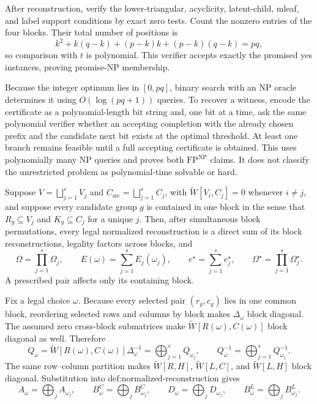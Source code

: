 After reconstruction, verify the lower-triangular, acyclicity, latent-child, mleaf, and label support conditions by exact zero tests.  Count the nonzero entries of the four blocks.  Their total number of positions is
\[
k^2+k(q-k)+(p-k)k+(p-k)(q-k)=pq,
\]
so comparison with \(t\) is polynomial.  This verifier accepts exactly the promised yes instances, proving promise-\(\mathrm{NP}\) membership.

Because the integer optimum lies in \([0,pq]\), binary search with an \(\mathrm{NP}\) oracle determines it using \(O(\log(pq+1))\) queries.  To recover a witness, encode the certificate as a polynomial-length bit string and, one bit at a time, ask the same polynomial verifier whether an accepting completion with the already chosen prefix and the candidate next bit exists at the optimal threshold.  At least one branch remains feasible until a full accepting certificate is obtained.  This uses polynomially many \(\mathrm{NP}\) queries and proves both \(\mathrm{FP}^{\mathrm{NP}}\) claims.  It does not classify the unrestricted problem as polynomial-time solvable or hard.

Suppose \(V=\bigsqcup_{j=1}^sV_j\) and \(C_{\mathrm{src}}=\bigsqcup_{j=1}^sC_j\), with \(\widetilde W[V_i,C_j]=0\) whenever \(i\ne j\), and suppose every candidate group \(g\) is contained in one block in the sense that \(R_g\subseteq V_j\) and \(K_g\subseteq C_j\) for a unique \(j\).  Then, after simultaneous block permutations, every legal normalized reconstruction is a direct sum of its block reconstructions, legality factors across blocks, and
\[
\Omega=\prod_{j=1}^s\Omega_j,
\qquad
E(\omega)=\sum_{j=1}^sE_j(\omega_j),
\qquad
e^\star=\sum_{j=1}^se_j^\star,
\qquad
\Omega^\star=\prod_{j=1}^s\Omega_j^\star.
\]
A prescribed pair affects only its containing block.

Fix a legal choice \(\omega\).  Because every selected pair \((r_g,c_g)\) lies in one common block, reordering selected rows and columns by block makes \(\Delta_\omega\) block diagonal.  The assumed zero cross-block submatrices make \(\widetilde W[R(\omega),C(\omega)]\) block diagonal as well.  Therefore
\[
Q_\omega
=\widetilde W[R(\omega),C(\omega)]\Delta_\omega^{-1}
=\bigoplus_{j=1}^sQ_{\omega_j},
\qquad
Q_\omega^{-1}=\bigoplus_{j=1}^sQ_{\omega_j}^{-1}.
\]
The same row--column partition makes \(\widetilde W[R,H]\), \(\widetilde W[L,C]\), and \(\widetilde W[L,H]\) block diagonal.  Substitution into \(\text{def:normalized-reconstruction}\) gives
\[
A_\omega=\bigoplus_jA_{\omega_j},
\qquad
B^C_\omega=\bigoplus_jB^C_{\omega_j},
\qquad
D_\omega=\bigoplus_jD_{\omega_j},
\qquad
B^L_\omega=\bigoplus_jB^L_{\omega_j}.
\]

